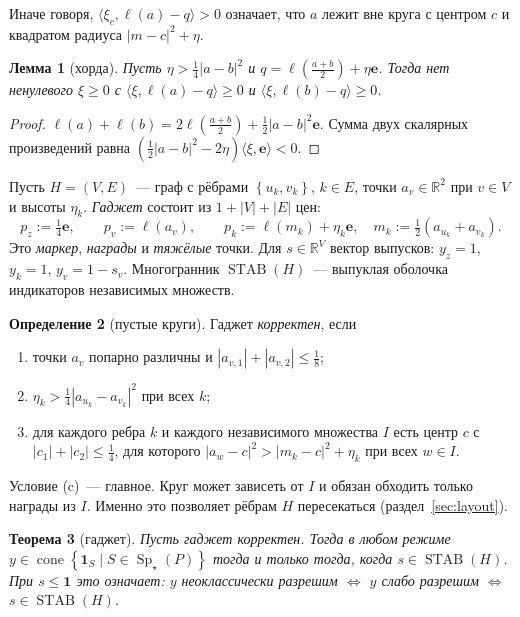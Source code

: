 \documentclass[a4paper,11pt]{article}
\theoremstyle{plain}
\newtheorem{theorem}{Теорема}[section]
\newtheorem{lemma}[theorem]{Лемма}
\theoremstyle{definition}
\newtheorem{definition}[theorem]{Определение}
\theoremstyle{remark}
\newcommand{\R}{\mathbb{R}}
\newcommand{\abs}[1]{\left\lvert #1 \right\rvert}
\newcommand{\set}[1]{\left\{ #1 \right\}}
\newcommand{\ip}[2]{\langle #1, #2\rangle}
\DeclareMathOperator{\cone}{cone}
\DeclareMathOperator{\Sp}{Sp}
\DeclareMathOperator{\STAB}{STAB}
\newcommand{\Spm}{\Sp_\star}
\newcommand{\e}{\mathbf e}
\begin{document}
Иначе говоря, $\ip{\xi_c}{\ell(a)-q}>0$ означает, что $a$ лежит вне круга с центром $c$ и квадратом радиуса $\abs{m-c}^2+\eta$.

\begin{lemma}[хорда]\label{lem:chord}
    Пусть $\eta>\frac14\abs{a-b}^2$ и $q=\ell(\frac{a+b}2)+\eta\e$. Тогда нет ненулевого $\xi\ge0$ с $\ip{\xi}{\ell(a)-q}\ge0$ и $\ip{\xi}{\ell(b)-q}\ge0$.
\end{lemma}

\begin{proof}
    $\ell(a)+\ell(b)=2\ell(\frac{a+b}2)+\frac12\abs{a-b}^2\e$. Сумма двух скалярных произведений равна $(\frac12\abs{a-b}^2-2\eta)\ip{\xi}{\e}<0$.
\end{proof}

Пусть $H=(V,E)$~--- граф с рёбрами $\set{u_k,v_k}$, $k\in E$, точки $a_v\in\R^2$ при $v\in V$ и высоты $\eta_k$. \emph{Гаджет} состоит из $1+\abs V+\abs E$ цен:
\[
    p_z:=\tfrac14\e,\qquad p_v:=\ell(a_v),\qquad p_k:=\ell(m_k)+\eta_k\e,\quad m_k:=\tfrac12(a_{u_k}+a_{v_k}).
\]
Это \emph{маркер}, \emph{награды} и \emph{тяжёлые} точки. Для $s\in\R^V$ вектор выпусков: $y_z=1$, $y_k=1$, $y_v=1-s_v$. Многогранник $\STAB(H)$~--- выпуклая оболочка индикаторов независимых множеств.

\begin{definition}[пустые круги]\label{def:valid}
    Гаджет \emph{корректен}, если
    \begin{enumerate}[label=(\alph*)]
        \item точки $a_v$ попарно различны и $\abs{a_{v,1}}+\abs{a_{v,2}}\le\frac18$;
        \item $\eta_k>\frac14\abs{a_{u_k}-a_{v_k}}^2$ при всех $k$;
        \item для каждого ребра $k$ и каждого независимого множества $I$ есть центр $c$ с $\abs{c_1}+\abs{c_2}\le\frac14$, для которого $\abs{a_w-c}^2>\abs{m_k-c}^2+\eta_k$ при всех $w\in I$.
    \end{enumerate}
\end{definition}

Условие (c)~--- главное. Круг может зависеть от $I$ и обязан обходить только награды из $I$. Именно это позволяет рёбрам $H$ пересекаться (раздел~\ref{sec:layout}).

\begin{theorem}[гаджет]\label{thm:gadget}
    Пусть гаджет корректен. Тогда в любом режиме $y\in\cone\set{\mathbf 1_S\mid S\in\Spm(P)}$ тогда и только тогда, когда $s\in\STAB(H)$. При $s\le\mathbf 1$ это означает: $y$ неоклассически разрешим $\iff$ $y$ слабо разрешим $\iff$ $s\in\STAB(H)$.
\end{theorem}
\end{document}
